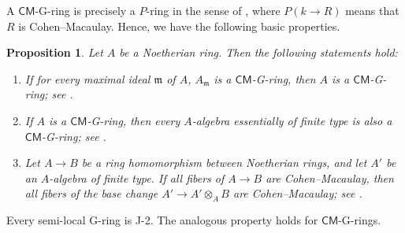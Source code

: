 \documentclass[a4paper, 11pt]{amsart}
\newtheorem{proposition}[theorem]{Proposition}
\theoremstyle{definition}
\begin{document}
A $\mathsf{CM}$-G-ring is precisely a $P$-ring in the sense of \cite[\href{https://stacks.math.columbia.edu/tag/0BIR}{Tag 0BIR}]{stacks-project}, where $P(k \to R)$ means that $R$ is Cohen--Macaulay. Hence, we have the following basic properties. 

\begin{proposition}\label{prop:CM-G}
    Let $A$ be a Noetherian ring. Then the following statements hold:
    \begin{enumerate}
        \item If for every maximal ideal $\mathfrak{m}$ of $A$, $A_\mathfrak{m}$ is a $\mathsf{CM}$\textnormal{-G-}ring, then $A$ is a $\mathsf{CM}$\textnormal{-G-}ring; see \cite[\href{https://stacks.math.columbia.edu/tag/0BIU}{Tag 0BIU}]{stacks-project}. 
        \item If $A$ is a $\mathsf{CM}$\textnormal{-G-}ring, then every $A$-algebra essentially of finite type is also a $\mathsf{CM}$\textnormal{-G-}ring; see \cite[\href{https://stacks.math.columbia.edu/tag/0BIV}{Tag 0BIV}]{stacks-project}. 
        \item Let $A \to B$ be a ring homomorphism between Noetherian rings, and let $A'$ be an $A$-algebra of finite type. If all fibers of $A \to B$ are Cohen--Macaulay, then all fibers of the base change $A' \to A' \otimes_A B$ are Cohen--Macaulay; see \cite[\href{https://stacks.math.columbia.edu/tag/0BIR}{Tag 0BIR} (A)]{stacks-project}.
    \end{enumerate}
\end{proposition}

Every semi-local G-ring is J-2. The analogous property holds for $\mathsf{CM}$-G-rings. 
\end{document}
